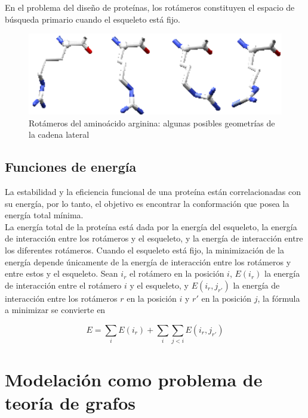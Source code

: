 \documentclass[letterpaper, 12pt]{report}
\begin{document}
En el problema del diseño de proteínas, los rotámeros constituyen el espacio de b\'usqueda primario cuando el esqueleto está fijo.


\begin{figure}
    \begin{center}
        \includegraphics[scale=0.5]{images/rotameros.png}
    \end{center}    
    \caption{Rotámeros del aminoácido arginina: algunas posibles geometr\'ias de la cadena lateral}
    \label{fig3}
\end{figure} 

\subsection{Funciones de energ\'ia}

La estabilidad y la eficiencia funcional de una proteína están correlacionadas con su energía, por lo tanto, el objetivo
es encontrar la conformación que posea la energía total mínima. \\

La energía total de la proteína está dada por la energía del esqueleto, la energía de interacción entre los rotámeros y el esqueleto,
y la energía de interacción entre los diferentes rotámeros. Cuando el esqueleto está fijo, la minimización de la energía 
depende únicamente de la energía de interacción entre los rotámeros y entre estos y el esqueleto.
Sean $i_r$ el rotámero en la posición $i$, $E(i_r)$ la energía de interacción entre el rotámero $i$ y el esqueleto, 
y $E(i_r , j_{r'})$ la energía de interacción entre los rotámeros $r$ en la posición $i$ y $r'$ en la posición $j$, la fórmula a minimizar se convierte en

\[E = \sum_i E(i_r) + \sum_i \sum_{j<i} E(i_r , j_{r'})  \]



\section{Modelaci\'on como problema de teor\'ia de grafos}
 
\end{document}
